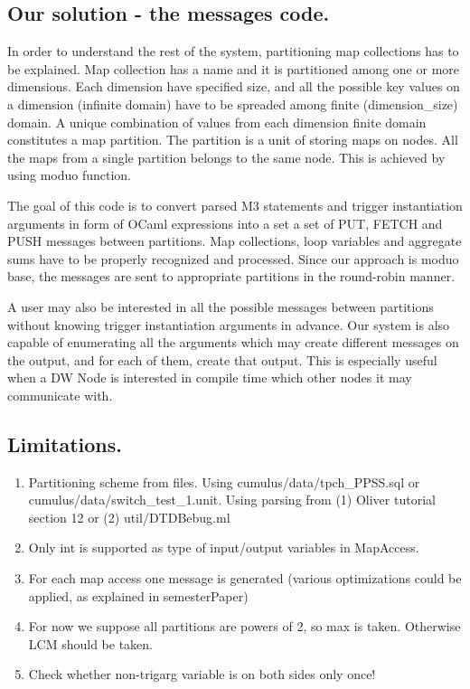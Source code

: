 \documentclass{sig-semester}
\begin{document}
\subsection{Our solution - the messages code.}
In order to understand the rest of the system, partitioning map collections has to be explained. Map collection has a name and it is partitioned among one or more dimensions. Each dimension have specified size, and all the possible key values on a dimension (infinite domain) have to be spreaded among finite (dimension\_size) domain. A unique combination of values from each dimension finite domain constitutes a map partition. The partition is a unit of storing maps on nodes. All the maps from a single partition belongs to the same node. This is achieved by using moduo function.

The goal of this code is to convert parsed M3 statements and trigger instantiation arguments in form of OCaml expressions into a set a set of PUT, FETCH and PUSH messages between partitions. Map collections, loop variables and aggregate sums have to be properly recognized and processed. Since our approach is moduo base, the messages are sent to appropriate partitions in the round-robin manner.

A user may also be interested in all the possible messages between partitions without knowing trigger instantiation arguments in advance. Our system is also capable of enumerating all the arguments which may create different messages on the output, and for each of them, create that output. This is especially useful when a DW Node is interested in compile time which other nodes it may communicate with.

\subsection{Limitations.}
\begin{enumerate}
 \item Partitioning scheme from files. Using cumulus/data/tpch\_PPSS.sql or cumulus/data/switch\_test\_1.unit. Using parsing from (1) Oliver tutorial section 12 or (2) util/DTDBebug.ml
 \item Only int is supported as type of input/output variables in MapAccess.
 \item For each map access one message is generated (various optimizations could be applied, as explained in semesterPaper)

 \item For now we suppose all partitions are powers of 2, so max is taken. Otherwise LCM should be taken.
 \item Check whether non-trigarg variable is on both sides only once!
\end{enumerate}
\end{document}
